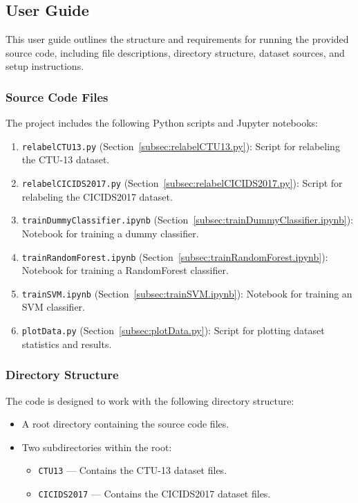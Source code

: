 \subsection{User Guide}\label{subsec:user-guide}

This user guide outlines the structure and requirements for running the provided source code, including file descriptions, directory structure, dataset sources, and setup instructions.

\subsubsection{Source Code Files}

The project includes the following Python scripts and Jupyter notebooks:

\begin{enumerate}
    \item \texttt{relabelCTU13.py} (Section~\ref{subsec:relabelCTU13.py}): Script for relabeling the CTU-13 dataset.
    \item \texttt{relabelCICIDS2017.py} (Section~\ref{subsec:relabelCICIDS2017.py}): Script for relabeling the CICIDS2017 dataset.
    \item \texttt{trainDummyClassifier.ipynb} (Section~\ref{subsec:trainDummyClassifier.ipynb}): Notebook for training a dummy classifier.
    \item \texttt{trainRandomForest.ipynb} (Section~\ref{subsec:trainRandomForest.ipynb}): Notebook for training a RandomForest classifier.
    \item \texttt{trainSVM.ipynb} (Section~\ref{subsec:trainSVM.ipynb}): Notebook for training an SVM classifier.
    \item \texttt{plotData.py} (Section~\ref{subsec:plotData.py}): Script for plotting dataset statistics and results.
\end{enumerate}

\subsubsection{Directory Structure}

The code is designed to work with the following directory structure:

\begin{itemize}
    \item A root directory containing the source code files.
    \item Two subdirectories within the root:
    \begin{itemize}
        \item \texttt{CTU13} --- Contains the CTU-13 dataset files.
        \item \texttt{CICIDS2017} --- Contains the CICIDS2017 dataset files.
    \end{itemize}
\end{itemize}

